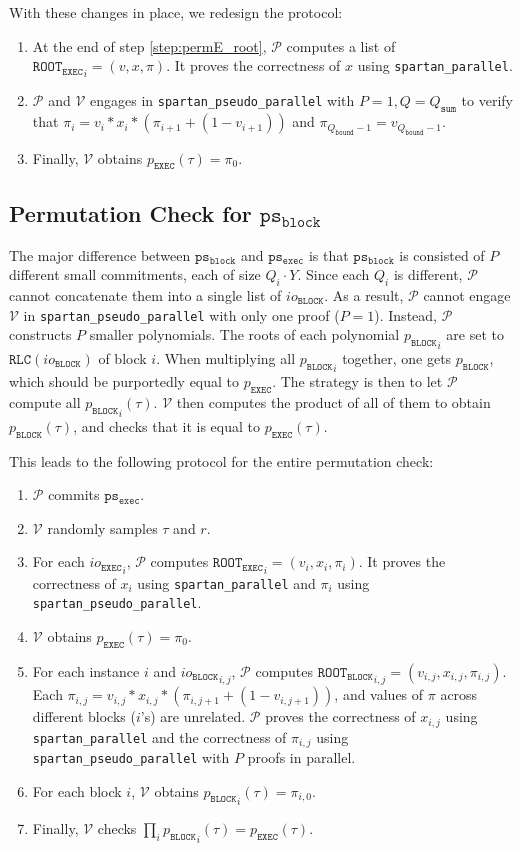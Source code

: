 \documentclass{article}
\newcommand{\code}{\texttt}
\newcommand{\Qbound}{Q_{\mathtt{bound}}}
\newcommand{\Qsum}{Q_{\mathtt{sum}}}
\renewcommand{\P}{\mathcal{P}}
\newcommand{\V}{\mathcal{V}}
\newcommand{\RLC}{\mathtt{RLC}}
\newcommand{\iob}{io_{\mathtt{BLOCK}}}
\newcommand{\ioe}{io_{\mathtt{EXEC}}}
\newcommand{\ROOTE}{\mathtt{ROOT_{EXEC}}}
\newcommand{\ROOTB}{\mathtt{ROOT_{BLOCK}}}
\newcommand{\psb}{\mathtt{ps_{block}}}
\newcommand{\pse}{\mathtt{ps_{exec}}}
\begin{document}
With these changes in place, we redesign the protocol:
\begin{enumerate}
    \item At the end of step \ref{step:permE_root}, $\P$ computes a list of $\ROOTE_i = (v, x, \pi)$. It proves the correctness of $x$ using \code{spartan\_parallel}.
    \item $\P$ and $\V$ engages in \code{spartan\_pseudo\_parallel} with $P = 1, Q = \Qsum$ to verify that $\pi_i = v_i * x_i * (\pi_{i+1} + (1 - v_{i+1}))$ and $\pi_{\Qbound - 1} = v_{\Qbound - 1}$.
    \item Finally, $\V$ obtains $p_\mathtt{EXEC}(\tau) = \pi_0$.
\end{enumerate}

\subsection{Permutation Check for $\psb$}

The major difference between $\psb$ and $\pse$ is that $\psb$ is consisted of $P$ different small commitments, each of size $Q_i\cdot Y$. Since each $Q_i$ is different, $\P$ cannot concatenate them into a single list of $\iob$. As a result, $\P$ cannot engage $\V$ in \code{spartan\_pseudo\_parallel} with only one proof ($P = 1$). Instead, $\P$ constructs $P$ smaller polynomials. The roots of each polynomial ${p_\mathtt{BLOCK}}_i$ are set to $\RLC(\iob)$ of block $i$. When multiplying all ${p_\mathtt{BLOCK}}_i$ together, one gets ${p_\mathtt{BLOCK}}$, which should be purportedly equal to ${p_\mathtt{EXEC}}$. The strategy is then to let $\P$ compute all ${p_\mathtt{BLOCK}}_i(\tau)$. $\V$ then computes the product of all of them to obtain ${p_\mathtt{BLOCK}}(\tau)$, and checks that it is equal to ${p_\mathtt{EXEC}}(\tau)$.

This leads to the following protocol for the entire permutation check:
\begin{enumerate}
    \item $\P$ commits $\pse$.
    \item $\V$ randomly samples $\tau$ and $r$.
    \item For each ${\ioe}_i$, $\P$ computes $\ROOTE_i = (v_i, x_i, \pi_i)$. It proves the correctness of $x_i$ using \code{spartan\_parallel} and $\pi_i$ using \code{spartan\_pseudo\_parallel}.
    \item $\V$ obtains $p_\mathtt{EXEC}(\tau) = \pi_0$.
    \item For each instance $i$ and ${\iob}_{i, j}$, $\P$ computes $\ROOTB_{i, j} = (v_{i,j}, x_{i,j}, \pi_{i,j})$. Each $\pi_{i, j} = v_{i, j} * x_{i, j} * (\pi_{i, j+1} + (1 - v_{i, j+1}))$, and values of $\pi$ across different blocks ($i$'s) are unrelated. $\P$ proves the correctness of $x_{i, j}$ using \code{spartan\_parallel} and the correctness of $\pi_{i, j}$ using \code{spartan\_pseudo\_parallel} with $P$ proofs in parallel.
    \item For each block $i$, $\V$ obtains ${p_\mathtt{BLOCK}}_i(\tau) = \pi_{i, 0}$.
    \item Finally, $\V$ checks $\prod_i {p_\mathtt{BLOCK}}_i(\tau) = p_\mathtt{EXEC}(\tau)$.
\end{enumerate}
\end{document}
